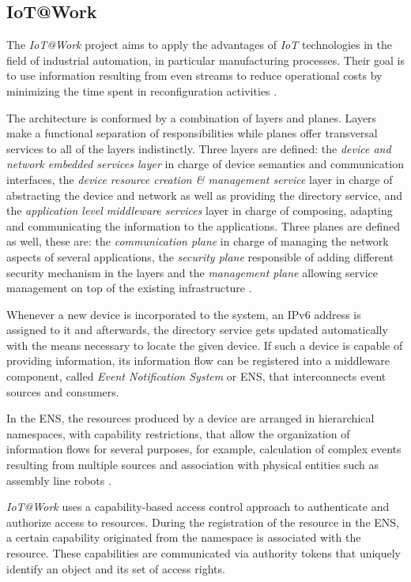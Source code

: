 \documentclass[journal]{IEEEtran}
\begin{document}
  \subsection{IoT@Work}

  The \emph{IoT@Work} project aims to apply the advantages of \emph{IoT} technologies in the field of industrial automation, in particular manufacturing processes. Their goal is to use information resulting from even streams to reduce operational costs by minimizing the time spent in reconfiguration activities \cite{IoTWorkWeb}.

  The architecture is conformed by a combination of layers and planes. Layers make a functional separation of responsibilities while planes offer transversal services to all of the layers indistinctly. Three layers are defined: the \emph{device and network embedded services layer} in charge of device semantics and communication interfaces, the \emph{device resource creation \& management service} layer in charge of abstracting the device and network as well as providing the directory service, and the \emph{application level middleware services} layer in charge of composing, adapting and communicating the information to the applications. Three planes are defined as well, these are: the \emph{communication plane} in charge of managing the network aspects of several applications, the \emph{security plane} responsible of adding different security mechanism in the layers and the \emph{management plane} allowing service management on top of the existing infrastructure \cite{Rotondi2013}.

  Whenever a new device is incorporated to the system, an IPv6 address is assigned to it and afterwards, the directory service gets updated automatically with the means necessary to locate the given device. If such a device is capable of providing information, its information flow can be registered into a middleware component, called \emph{Event Notification System} or ENS, that interconnects event sources and consumers. 

  In the ENS, the resources produced by a device are arranged in hierarchical namespaces, with capability restrictions, that allow the organization of information flows for several purposes, for example, calculation of complex events resulting from multiple sources and association with physical entities such as assembly line robots \cite{Trsek2013}.

  \emph{IoT@Work} uses a capability-based access control approach to authenticate and authorize access to resources. During the registration of the resource in the ENS, a certain capability originated from the namespace is associated with the resource. These capabilities are communicated via authority tokens that uniquely identify an object and its set of access rights.
\end{document}
